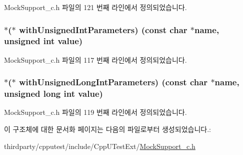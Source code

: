 Mock\+Support\+\_\+c.\+h 파일의 121 번째 라인에서 정의되었습니다.

\subsubsection[{\texorpdfstring{with\+Unsigned\+Int\+Parameters}{withUnsignedIntParameters}}]{$\ast$($\ast$ with\+Unsigned\+Int\+Parameters) (const char $\ast$name, unsigned int value)}\hypertarget{struct_s_mock_expected_call__c_af0ec6d4712890dfb6da5800dc737ab03}{}\label{struct_s_mock_expected_call__c_af0ec6d4712890dfb6da5800dc737ab03}


Mock\+Support\+\_\+c.\+h 파일의 117 번째 라인에서 정의되었습니다.

\subsubsection[{\texorpdfstring{with\+Unsigned\+Long\+Int\+Parameters}{withUnsignedLongIntParameters}}]{$\ast$($\ast$ with\+Unsigned\+Long\+Int\+Parameters) (const char $\ast$name, unsigned long int value)}\hypertarget{struct_s_mock_expected_call__c_a040c3fc1ac73b02666875140a945ec28}{}\label{struct_s_mock_expected_call__c_a040c3fc1ac73b02666875140a945ec28}


Mock\+Support\+\_\+c.\+h 파일의 119 번째 라인에서 정의되었습니다.



이 구조체에 대한 문서화 페이지는 다음의 파일로부터 생성되었습니다.\+:\begin{DoxyCompactItemize}
\item 
thirdparty/cpputest/include/\+Cpp\+U\+Test\+Ext/\hyperlink{_mock_support__c_8h}{Mock\+Support\+\_\+c.\+h}\end{DoxyCompactItemize}
